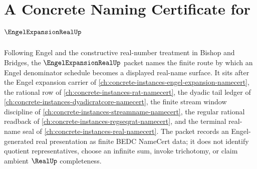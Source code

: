 \chapter{A Concrete Naming Certificate for $\EngelExpansionRealUp$}
\label{ch:concrete-instances-engel-expansion-real-namecert}

Following Engel and the constructive real-number treatment in Bishop and Bridges, the $\EngelExpansionRealUp$ packet names the finite route by which an Engel denominator schedule becomes a displayed real-name surface. It sits after the Engel expansion carrier of \autoref{ch:concrete-instances-engel-expansion-namecert}, the rational row of \autoref{ch:concrete-instances-rat-namecert}, the dyadic tail ledger of \autoref{ch:concrete-instances-dyadicratcore-namecert}, the finite stream window discipline of \autoref{ch:concrete-instances-streamname-namecert}, the regular rational readback of \autoref{ch:concrete-instances-regseqrat-namecert}, and the terminal real-name seal of \autoref{ch:concrete-instances-real-namecert}. The packet records an Engel-generated real presentation as finite BEDC NameCert data; it does not identify quotient representatives, choose an infinite sum, invoke trichotomy, or claim ambient $\RealUp$ completeness.

